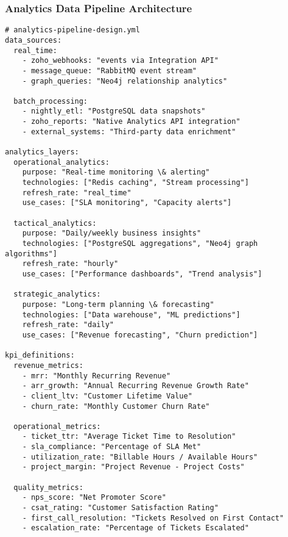 \subsubsection{Analytics Data Pipeline Architecture}
\begin{verbatim}
# analytics-pipeline-design.yml
data_sources:
  real_time:
    - zoho_webhooks: "events via Integration API"
    - message_queue: "RabbitMQ event stream"
    - graph_queries: "Neo4j relationship analytics"
    
  batch_processing:
    - nightly_etl: "PostgreSQL data snapshots"
    - zoho_reports: "Native Analytics API integration"
    - external_systems: "Third-party data enrichment"

analytics_layers:
  operational_analytics:
    purpose: "Real-time monitoring \& alerting"
    technologies: ["Redis caching", "Stream processing"]
    refresh_rate: "real_time"
    use_cases: ["SLA monitoring", "Capacity alerts"]
    
  tactical_analytics:
    purpose: "Daily/weekly business insights"
    technologies: ["PostgreSQL aggregations", "Neo4j graph algorithms"]
    refresh_rate: "hourly"
    use_cases: ["Performance dashboards", "Trend analysis"]
    
  strategic_analytics:
    purpose: "Long-term planning \& forecasting"
    technologies: ["Data warehouse", "ML predictions"]
    refresh_rate: "daily"
    use_cases: ["Revenue forecasting", "Churn prediction"]

kpi_definitions:
  revenue_metrics:
    - mrr: "Monthly Recurring Revenue"
    - arr_growth: "Annual Recurring Revenue Growth Rate"
    - client_ltv: "Customer Lifetime Value"
    - churn_rate: "Monthly Customer Churn Rate"
    
  operational_metrics:
    - ticket_ttr: "Average Ticket Time to Resolution"
    - sla_compliance: "Percentage of SLA Met"
    - utilization_rate: "Billable Hours / Available Hours"
    - project_margin: "Project Revenue - Project Costs"
    
  quality_metrics:
    - nps_score: "Net Promoter Score"
    - csat_rating: "Customer Satisfaction Rating"
    - first_call_resolution: "Tickets Resolved on First Contact"
    - escalation_rate: "Percentage of Tickets Escalated"
\end{verbatim}

